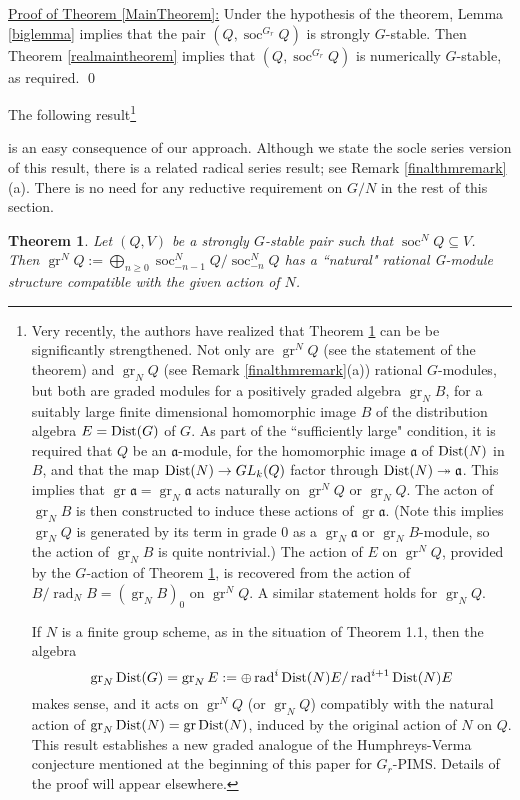 \documentclass[11pt,leqno,amscd,amssymb,verbatim, url]{amsart}
\newtheorem{thm}{Theorem}[section]%
\theoremstyle{definition}
\numberwithin{equation}{thm}
\newcommand{\fa}{{\mathfrak a}}
\newcommand{\gr}{\operatorname{ {gr}}}
\newcommand{\soc}{\operatorname{soc}}
\newcommand{\rad}{\operatorname{rad}}
\begin{document}
\medskip
\noindent
{\underline{Proof of Theorem \ref{MainTheorem}:} Under the hypothesis of the theorem, Lemma \ref{biglemma} implies that
the pair $(Q,\soc^{G_r}Q)$ is strongly $G$-stable. Then Theorem \ref{realmaintheorem} implies that $(Q,\soc^{G_r}Q)$
is numerically $G$-stable, as required. \qed


\medskip
The following result\footnote{Very recently, the authors have realized that Theorem \ref{finalthm} can be be
significantly strengthened. Not only are $\gr^NQ$ (see the statement of the theorem) and $\gr_NQ$ (see Remark \ref{finalthmremark}(a)) rational $G$-modules, but both are  graded modules for a positively
graded algebra $\gr_NB$, for a suitably large finite dimensional homomorphic
image $B$ of the distribution algebra  $E={\text{\rm Dist}}(G)$ of $G$. As part of the ``sufficiently large"
condition, it is required that  $Q$ be an $\fa$-module, for the homomorphic image $\fa$ of $\text{\rm Dist}(N)$
in $B$, and that the map $\text{\rm Dist}(N)\to GL_k(Q)$ factor through $\text{\rm Dist}(N)\twoheadrightarrow\fa$. 
 This implies that $\gr\fa=\gr_N\fa$ acts naturally on $\gr^NQ$ or $\gr_NQ$. The acton of $\gr_NB$ 
 is then constructed to induce these actions of $\gr\fa$.  (Note this implies $\gr_NQ$ is generated by its term
in grade 0 as a $\gr_N\fa$ or $\gr_NB$-module, so the action of $\gr_NB$ is quite nontrivial.) The action of $E$ on
$\gr^NQ$, provided by the $G$-action of Theorem \ref{finalthm}, is recovered from the
action of $B/\rad_NB=(\gr_NB)_0$ on $\gr^N Q$. A similar statement holds for $\gr_NQ$.  

If $N$ is a finite group scheme, as in the situation of
Theorem 1.1, then the algebra
$$\gr_N{\text{\rm Dist}}(G)=\gr_NE:=\oplus\rad^i{\text{\rm Dist}}(N)E/\rad^{i+1}{\text{\rm Dist}}(N)E$$
makes sense, and it acts on $\gr^NQ$ (or $\gr_NQ$) compatibly with the natural action of
$\gr_N{\text{\rm Dist}}(N)=\gr{\text{\rm Dist}}(N)$, induced by the original action of $N$ on $Q$.   This result establishes a new graded analogue of the Humphreys-Verma 
conjecture mentioned at the beginning of this paper for $G_r$-PIMS.  Details of
the proof will appear elsewhere.   }
} is an easy consequence of our approach.    Although
we state the socle series version of this result, there is a related radical series result; see Remark \ref{finalthmremark}(a).
There is no need  for any reductive
       requirement  on $G/N$  in the rest of this  section.

\begin{thm}\label{finalthm}  Let $(Q,V)$ be a strongly $G$-stable pair such that $\soc^NQ\subseteq V$.
Then $\gr^NQ:=\bigoplus_{n\geq 0}\soc^N_{-n-1}Q/\soc^N_{-n}Q$ has a ``natural" rational G-module structure
compatible with the given action of $N$.
\end{thm}
\end{document}

